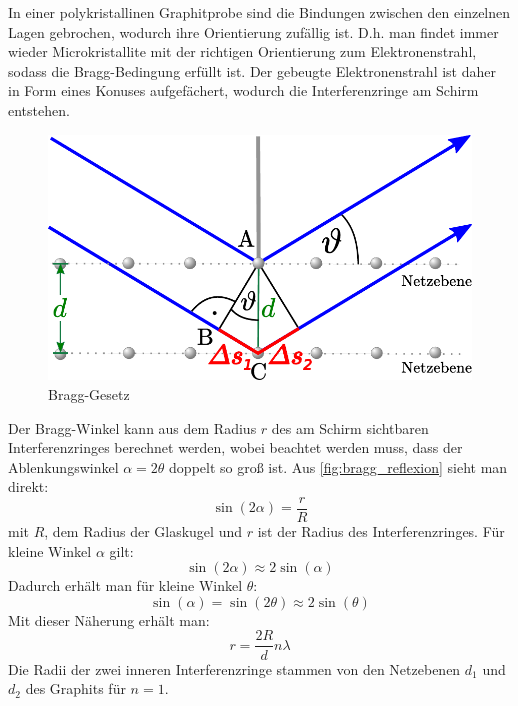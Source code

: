 \documentclass[ngerman]{scrartcl}
\begin{document}
In einer polykristallinen Graphitprobe sind die Bindungen zwischen den einzelnen Lagen gebrochen, wodurch ihre Orientierung zufällig ist. D.h. man findet immer wieder
Microkristallite mit der richtigen Orientierung zum Elektronenstrahl, sodass die Bragg-Bedingung erfüllt ist. Der gebeugte Elektronenstrahl ist daher in Form eines Konuses aufgefächert, wodurch die Interferenzringe am Schirm entstehen.
%
\begin{figure}[H]
    \centering
    \begin{samepage}
        \includegraphics[width=0.5\linewidth]{fig/bragg-reflexion.pdf}
        \caption{Bragg-Gesetz}
        \label{fig:bragg_reflexion}
    \end{samepage}
\end{figure}
%
Der Bragg-Winkel kann aus dem Radius $r$ des am Schirm sichtbaren Interferenzringes berechnet werden, wobei beachtet werden muss, dass der Ablenkungswinkel $\alpha = 2\theta$ doppelt so groß ist. Aus \autoref{fig:bragg_reflexion} sieht man direkt:
%
\begin{equation}
    \label{eq:ablenkwinkel_radius}
    \sin(2\alpha) = \frac{r}{R}
\end{equation}
%
mit $R$, dem Radius der Glaskugel und $r$ ist der Radius des Interferenzringes. Für kleine Winkel $\alpha$ gilt:
%
\[\sin(2\alpha) \approx 2\sin(\alpha)\]
%
Dadurch erhält man für kleine Winkel $\theta$:
%
\[\sin(\alpha)=\sin(2\theta)\approx2\sin(\theta)\]
%
Mit dieser Näherung erhält man:
%
\begin{equation}
    \label{eq:radius_wellenlaenge}
    r=\frac{2R}{d}n\lambda
\end{equation}
%
Die Radii der zwei inneren Interferenzringe stammen von den Netzebenen $d_1$ und $d_2$ des Graphits für $n=1$.
\end{document}
